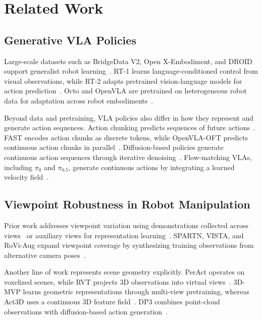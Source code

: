 \section{Related Work}

\subsection{Generative VLA Policies}

Large-scale datasets such as BridgeData V2, Open X-Embodiment, and DROID support generalist robot learning~\cite{walke2023bridgev2,oneill2024oxe,khazatsky2024droid}. RT-1 learns language-conditioned control from visual observations, while RT-2 adapts pretrained vision-language models for action prediction~\cite{brohan2023rt1,zitkovich2023rt2}. Octo and OpenVLA are pretrained on heterogeneous robot data for adaptation across robot embodiments~\cite{ghosh2024octo,kim2025openvla}.

Beyond data and pretraining, VLA policies also differ in how they represent and generate action sequences. Action chunking predicts sequences of future actions~\cite{zhao2023act}. FAST encodes action chunks as discrete tokens, while OpenVLA-OFT predicts continuous action chunks in parallel~\cite{pertsch2025fast,kim2025openvlaoft}. Diffusion-based policies generate continuous action sequences through iterative denoising~\cite{chi2025diffusionpolicy,ze2024dp3,liu2025rdt,wen2025diffusionvla}. Flow-matching VLAs, including $\pi_0$ and $\pi_{0.5}$, generate continuous actions by integrating a learned velocity field~\cite{black2025pi0,black2025pi05}.


\subsection{Viewpoint Robustness in Robot Manipulation}

Prior work addresses viewpoint variation using demonstrations collected across views~\cite{ablett2021multiview} or auxiliary views for representation learning~\cite{seo2023multiview}. SPARTN, VISTA, and RoVi-Aug expand viewpoint coverage by synthesizing training observations from alternative camera poses~\cite{zhou2023spartn,tian2025vista,chen2025roviaug}.

Another line of work represents scene geometry explicitly. PerAct operates on voxelized scenes, while RVT projects 3D observations into virtual views~\cite{shridhar2023peract,goyal2023rvt}. 3D-MVP learns geometric representations through multi-view pretraining, whereas Act3D uses a continuous 3D feature field~\cite{qian20253dmvp,gervet2023act3d}. DP3 combines point-cloud observations with diffusion-based action generation~\cite{ze2024dp3}.

